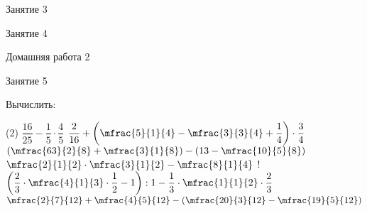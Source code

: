 \begin{class}[number=3]
	\begin{listofex}
		\item Занятие 3
	\end{listofex}
\end{class}

\begin{class}[number=4]
	\begin{listofex}
		\item Занятие 4
	\end{listofex}
\end{class}

\begin{homework}[number=2]
	\begin{listofex}
		\item Домашняя работа 2
	\end{listofex}
\end{homework}

\begin{class}[number=5]
	\begin{listofex}
		\item Занятие 5
	\end{listofex}
\end{class}

\begin{class}[number=6]
	\begin{listofex}
			\item  Вычислить:
		\begin{tasks}(2)
			\task \( \dfrac{16}{25}-\dfrac{1}{5}\cdot\dfrac{4}{5} \)
			\task  \(\dfrac{2}{16}+\left( \mfrac{5}{1}{4}-\mfrac{3}{3}{4}+\dfrac{1}{4} \right)\cdot\dfrac{3}{4}\)
			\task \( \left( \mfrac{63}{2}{8}+\mfrac{3}{1}{8} \right)-\left( 13-\mfrac{10}{5}{8} \right) \)
			\task \( \mfrac{2}{1}{2}\cdot\mfrac{3}{1}{2}-\mfrac{8}{1}{4} \)
			\task!\( \left( \dfrac{2}{3}\cdot\mfrac{4}{1}{3}\cdot\dfrac{1}{2}-1 \right):1-\dfrac{1}{3}\cdot\mfrac{1}{1}{2}\cdot\dfrac{2}{3} \)
			\task \( \mfrac{2}{7}{12}+\mfrac{4}{5}{12}-\left( \mfrac{20}{3}{12}-\mfrac{19}{5}{12} \right) \)
		\end{tasks}
		
	\end{listofex}
\end{class}

